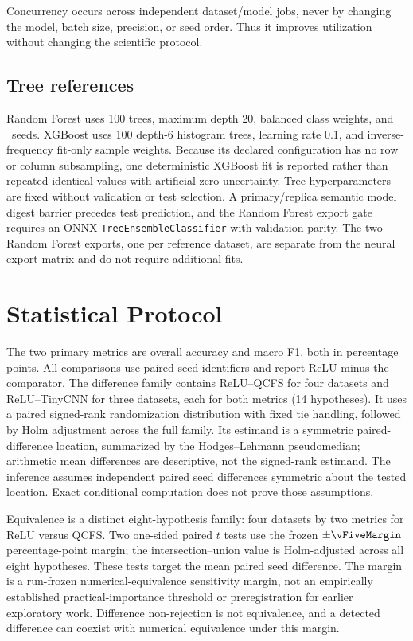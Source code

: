 \documentclass[10pt,conference]{IEEEtran}
\begin{document}
Concurrency occurs across independent dataset/model jobs, never by changing
the model, batch size, precision, or seed order. Thus it improves utilization
without changing the scientific protocol.

\subsection{Tree references}

Random Forest uses 100 trees, maximum depth 20, balanced class weights, and
\vFiveNslRandomForestSeeds\ seeds. XGBoost uses 100 depth-6 histogram trees,
learning rate 0.1, and inverse-frequency fit-only sample weights. Because its
declared configuration has no row or column subsampling, one deterministic
XGBoost fit is reported rather than repeated identical values with artificial
zero uncertainty. Tree hyperparameters are fixed without validation or test
selection. A primary/replica semantic model digest barrier precedes test
prediction, and the Random Forest export gate requires an ONNX
\texttt{TreeEnsembleClassifier} with validation parity. The two Random Forest
exports, one per reference dataset, are separate from the neural export matrix
and do not require additional fits.

\section{Statistical Protocol}

The two primary metrics are overall accuracy and macro F1, both in percentage
points. All comparisons use paired seed identifiers and report ReLU minus the
comparator. The difference family contains ReLU--QCFS for four datasets and
ReLU--TinyCNN for three datasets, each for both metrics (14 hypotheses). It
uses a paired signed-rank randomization distribution with fixed tie handling,
followed by Holm adjustment across the full family. Its estimand is a symmetric
paired-difference location, summarized by the Hodges--Lehmann pseudomedian;
arithmetic mean differences are descriptive, not the signed-rank estimand.
The inference assumes independent paired seed differences symmetric about the
tested location. Exact conditional computation does not prove those assumptions.

Equivalence is a distinct eight-hypothesis family: four datasets by two
metrics for ReLU versus QCFS. Two one-sided paired $t$ tests use the frozen
$\pm\vFiveMargin$ percentage-point margin; the intersection--union value is
Holm-adjusted across all eight hypotheses. These tests target the mean paired
seed difference. The margin is a run-frozen numerical-equivalence sensitivity
margin, not an empirically established practical-importance threshold or
preregistration for earlier exploratory work. Difference non-rejection is not
equivalence, and a detected difference can coexist with numerical equivalence
under this margin.
\end{document}
